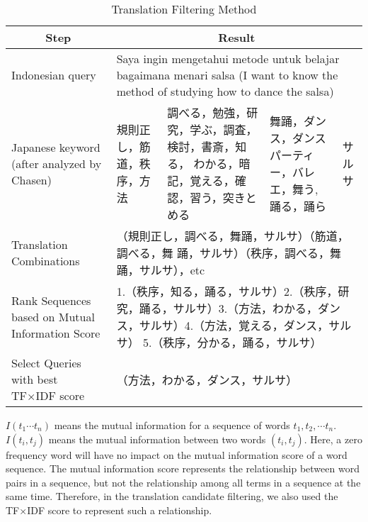 \documentclass[english]{jnlp_1.3c}
\begin{document}
\begin{table}[b]
  \caption{Translation Filtering Method}
  \label{table:Translation Filtering Method}
  \begin{center}
   \begin{tabular}{|l|l|l|l|l|}\hline
    \multicolumn{1}{|c|}{Step} & \multicolumn{4}{|c|}{Result} \\ \hline
    \multicolumn{1}{|p{10em}|}{Indonesian query} &
    \multicolumn{4}{|p{30em}|}{Saya ingin mengetahui metode untuk belajar
    bagaimana menari salsa (I want to know the method of studying how to
    dance the salsa)} \\ \hline
    \multicolumn{1}{|p{10em}|}{Japanese keyword (after analyzed by
     Chasen)} & \multicolumn{1}{|p{7em}|}{規則正し，筋道，秩序，方法} &
     \multicolumn{1}{|p{8em}|}{調べる，勉強，研究，学ぶ，調査，検討，書斎，知る，
     わかる，暗記，覚える，確認，習う，突きとめる} &
     \multicolumn{1}{|p{7em}|}{舞踊，ダンス，ダンスパーティー，バレエ，舞う,
     踊る，踊ら} & サルサ \\ \hline
    \multicolumn{1}{|p{10em}|}{Translation Combinations} &
    \multicolumn{4}{|p{30em}|}{（規則正し，調べる，舞踊，サルサ）（筋道，調べる，舞
    踊，サルサ）（秩序，調べる，舞踊，サルサ），etc} \\ \hline
    \multicolumn{1}{|p{10em}|}{Rank Sequences based on Mutual Information
    Score} &
    \multicolumn{4}{|p{30em}|}{1.（秩序，知る，踊る，サルサ）2.（秩序，研
    究，踊る，サルサ）3.（方法，わかる，ダンス，サルサ）4.（方法，覚える，ダンス，サル
    サ） 5.（秩序，分かる，踊る，サルサ）} \\ \hline
    \multicolumn{1}{|p{10em}|}{Select Queries with best TF×IDF score} &
    \multicolumn{4}{|l|}{（方法，わかる，ダンス，サルサ）} \\ \hline
   \end{tabular}
  \end{center}
\end{table}

$I(t_1 \cdots t_n )$ means the mutual information for a sequence of
words $t_1, t_2, \cdots t_n$. $I(t_i,t_j)$ means the mutual information
between two words $(t_i,t_j)$.  Here, a zero frequency word will have no
impact on the mutual information score of a word sequence.  The mutual
information score represents the relationship between word pairs in a
sequence, but not the relationship among all terms in a sequence at the
same time. Therefore, in the translation candidate filtering, we also
used the TF×IDF score to represent such a relationship.  
\end{document}
